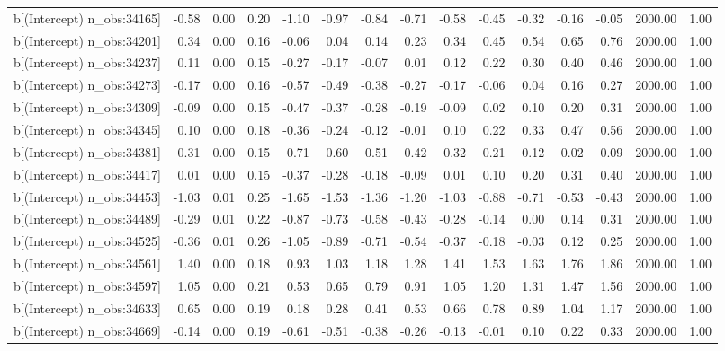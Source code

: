 \begin{table}[ht]
\begin{tabular}{rrrrrrrrrrrrrrr}
  b[(Intercept) n\_obs:34165] & -0.58 & 0.00 & 0.20 & -1.10 & -0.97 & -0.84 & -0.71 & -0.58 & -0.45 & -0.32 & -0.16 & -0.05 & 2000.00 & 1.00 \\ 
  b[(Intercept) n\_obs:34201] & 0.34 & 0.00 & 0.16 & -0.06 & 0.04 & 0.14 & 0.23 & 0.34 & 0.45 & 0.54 & 0.65 & 0.76 & 2000.00 & 1.00 \\ 
  b[(Intercept) n\_obs:34237] & 0.11 & 0.00 & 0.15 & -0.27 & -0.17 & -0.07 & 0.01 & 0.12 & 0.22 & 0.30 & 0.40 & 0.46 & 2000.00 & 1.00 \\ 
  b[(Intercept) n\_obs:34273] & -0.17 & 0.00 & 0.16 & -0.57 & -0.49 & -0.38 & -0.27 & -0.17 & -0.06 & 0.04 & 0.16 & 0.27 & 2000.00 & 1.00 \\ 
  b[(Intercept) n\_obs:34309] & -0.09 & 0.00 & 0.15 & -0.47 & -0.37 & -0.28 & -0.19 & -0.09 & 0.02 & 0.10 & 0.20 & 0.31 & 2000.00 & 1.00 \\ 
  b[(Intercept) n\_obs:34345] & 0.10 & 0.00 & 0.18 & -0.36 & -0.24 & -0.12 & -0.01 & 0.10 & 0.22 & 0.33 & 0.47 & 0.56 & 2000.00 & 1.00 \\ 
  b[(Intercept) n\_obs:34381] & -0.31 & 0.00 & 0.15 & -0.71 & -0.60 & -0.51 & -0.42 & -0.32 & -0.21 & -0.12 & -0.02 & 0.09 & 2000.00 & 1.00 \\ 
  b[(Intercept) n\_obs:34417] & 0.01 & 0.00 & 0.15 & -0.37 & -0.28 & -0.18 & -0.09 & 0.01 & 0.10 & 0.20 & 0.31 & 0.40 & 2000.00 & 1.00 \\ 
  b[(Intercept) n\_obs:34453] & -1.03 & 0.01 & 0.25 & -1.65 & -1.53 & -1.36 & -1.20 & -1.03 & -0.88 & -0.71 & -0.53 & -0.43 & 2000.00 & 1.00 \\ 
  b[(Intercept) n\_obs:34489] & -0.29 & 0.01 & 0.22 & -0.87 & -0.73 & -0.58 & -0.43 & -0.28 & -0.14 & 0.00 & 0.14 & 0.31 & 2000.00 & 1.00 \\ 
  b[(Intercept) n\_obs:34525] & -0.36 & 0.01 & 0.26 & -1.05 & -0.89 & -0.71 & -0.54 & -0.37 & -0.18 & -0.03 & 0.12 & 0.25 & 2000.00 & 1.00 \\ 
  b[(Intercept) n\_obs:34561] & 1.40 & 0.00 & 0.18 & 0.93 & 1.03 & 1.18 & 1.28 & 1.41 & 1.53 & 1.63 & 1.76 & 1.86 & 2000.00 & 1.00 \\ 
  b[(Intercept) n\_obs:34597] & 1.05 & 0.00 & 0.21 & 0.53 & 0.65 & 0.79 & 0.91 & 1.05 & 1.20 & 1.31 & 1.47 & 1.56 & 2000.00 & 1.00 \\ 
  b[(Intercept) n\_obs:34633] & 0.65 & 0.00 & 0.19 & 0.18 & 0.28 & 0.41 & 0.53 & 0.66 & 0.78 & 0.89 & 1.04 & 1.17 & 2000.00 & 1.00 \\ 
  b[(Intercept) n\_obs:34669] & -0.14 & 0.00 & 0.19 & -0.61 & -0.51 & -0.38 & -0.26 & -0.13 & -0.01 & 0.10 & 0.22 & 0.33 & 2000.00 & 1.00 \\ 

\end{tabular}
\end{table}
